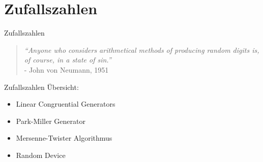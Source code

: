 \documentclass{beamer}
\begin{document}
\section{Zufallszahlen}
\begin{frame}{Zufallszahlen}
	\begin{quote}
	\textit{“Anyone who considers arithmetical methods of producing random digits is, of course, in a state of sin.”} \\ - John von Neumann, 1951
	\end{quote}
\end{frame}

\begin{frame}{Zufallszahlen}
	Übersicht:
	\begin{itemize}
		\item<1-> Linear Congruential Generators
		\item<1-> Park-Miller Generator
		\item<1-> Mersenne-Twister Algorithmus
		\item<1-> Random Device
	\end{itemize}
\end{frame}
\end{document}
